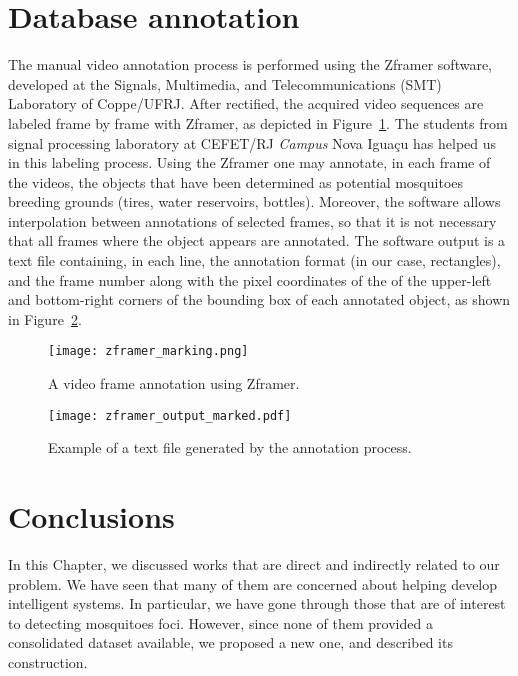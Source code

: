   \section{Database annotation}\label{sec:annot}
  The manual video annotation process is performed using the Zframer software, developed at the Signals, Multimedia, and Telecommunications (SMT)
   Laboratory of Coppe/UFRJ.
  After rectified, the acquired video sequences are labeled frame by frame with Zframer, as depicted in Figure~\ref{fig:zframer1}.
  The students from signal processing laboratory at CEFET/RJ {\it Campus} Nova Iguaçu has helped us in this labeling process.
  Using the Zframer one may annotate, in each frame of the videos, the objects that have been determined as potential mosquitoes breeding grounds (\eg tires, water reservoirs, bottles).
  Moreover, the software allows interpolation between annotations of selected frames, so that it is not necessary that all frames where the object appears are annotated.
  The software output is a text file containing, in each line, the annotation format (in our case, rectangles), and the frame number along with the pixel coordinates of the of the upper-left and bottom-right corners of the bounding box of each annotated object, as shown in Figure~\ref{fig:zframer_output}.
\begin{figure}[htb]
	\centering
	\texttt{[image: zframer\_marking.png]}%
	\caption{A video frame annotation using Zframer.}
	\label{fig:zframer1}
\end{figure}
%
\begin{figure}[htb]
	\centering
	\texttt{[image: zframer\_output\_marked.pdf]}
	\caption{Example of a text file generated by the annotation process.}
	\label{fig:zframer_output}
\end{figure}

  \section{Conclusions}
%
In this Chapter, we discussed works that are direct and indirectly related to our problem.
We have seen that many of them are concerned about helping develop intelligent systems.
In particular, we have gone through those that are of interest to detecting mosquitoes foci.
However, since none of them provided a consolidated dataset available,
we proposed a new one, and described its construction.





